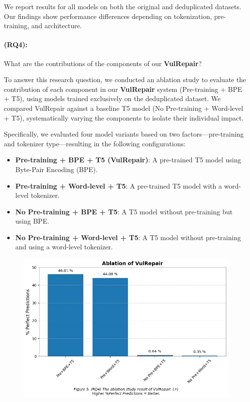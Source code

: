 We report results for all models on both the original and deduplicated datasets. Our findings show performance differences depending on tokenization, pre-training, and architecture.

\paragraph{(RQ4):} What are the contributions of the components of our \textbf{VulRepair}?

To answer this research question, we conducted an ablation study to evaluate the contribution of each component in our \textbf{VulRepair} system (Pre-training + BPE + T5), using models trained exclusively on the deduplicated dataset. We compared VulRepair against a baseline T5 model (No Pre-training + Word-level + T5), systematically varying the components to isolate their individual impact.

Specifically, we evaluated four model variants based on two factors—pre-training and tokenizer type—resulting in the following configurations:

\begin{itemize}
    \item \textbf{Pre-training + BPE + T5 (VulRepair)}: A pre-trained T5 model using Byte-Pair Encoding (BPE).
    \item \textbf{Pre-training + Word-level + T5}: A pre-trained T5 model with a word-level tokenizer.
    \item \textbf{No Pre-training + BPE + T5}: A T5 model without pre-training but using BPE.
    \item \textbf{No Pre-training + Word-level + T5}: A T5 model without pre-training and using a word-level tokenizer.
\end{itemize}

\begin{figure}[H]
    \centering
    \includegraphics[width=\linewidth]{figures/rq4ablations.png}
    \label{fig:vulrepair_ablation}
\end{figure}


